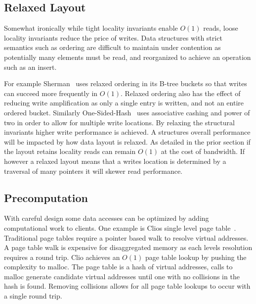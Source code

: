 \subsection{Relaxed Layout} 

Somewhat ironically while tight locality invariants enable $O(1)$ reads, loose
locality invariants reduce the price of writes. Data structures with strict
semantics such as ordering are difficult to maintain under contention as
potentially many elements must be read, and reorganized to achieve an operation
such as an insert.

For example Sherman~\cite{sherman} uses relaxed ordering in its B-tree buckets
so that writes can succeed more frequently in $O(1)$. Relaxed ordering also has
the effect of reducing write amplification as only a single entry is written,
and not an entire ordered bucket. Similarly One-Sided-Hash~\cite{one-sided-hash}
uses associative cashing and power of two in order to allow for multiple write
locations. By relaxing the structural invariants higher write performance is
achieved. A structures overall performance will be impacted by how data layout
is relaxed. As detailed in the prior section if the layout retains locality
reads can remain $O(1)$ at the cost of bandwidth. If however a relaxed layout
means that a writes location is determined by a traversal of many pointers it
will skewer read performance.


\subsection{Precomputation} 

With careful design some data accesses can be optimized by adding computational
work to clients. One example is Clios single level page table~\cite{clio}.
Traditional page tables require a pointer based walk to resolve virtual
addresses. A page table walk is expensive for disaggregated memory as each
levels resolution requires a round trip. Clio achieves an $O(1)$ page table
lookup by pushing the complexity to malloc. The page table is a hash of virtual
addresses, calls to malloc generate candidate virtual addresses until one with
no collisions in the hash is found. Removing collisions allows for all page
table lookups to occur with a single round trip.


